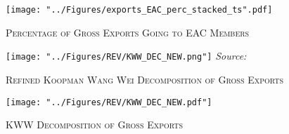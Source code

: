 \documentclass[a4paper]{article}
\begin{document}
\begin{figure}[h!] \vspace{-3mm}
\centering
\caption{\label{fig:exp_EAC_share}\textsc{Percentage of Gross Exports Going to EAC Members}}
\texttt{[image: "../Figures/exports\_EAC\_perc\_stacked\_ts".pdf]} %
\end{figure}
\FloatBarrier



\begin{figure}[h!] %
\centering
\caption{\label{fig:KWW}\textsc{Refined Koopman Wang Wei Decomposition of Gross Exports}}
\texttt{[image: "../Figures/REV/KWW\_DEC\_NEW.png"]} %
\raggedleft
\scriptsize
\emph{Source:} \citet{antras2022global}
\end{figure}
\FloatBarrier

\begin{figure}[h!]
\centering
\caption{\label{fig:KWW_fill_ts}\textsc{KWW Decomposition of Gross Exports}}
\texttt{[image: "../Figures/REV/KWW\_DEC\_NEW.pdf"]} %
\end{figure}
\FloatBarrier
\end{document}
